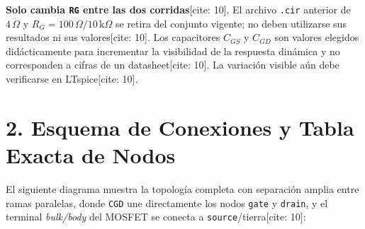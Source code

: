 \documentclass[11pt, a4paper]{article}
\begin{document}
\begin{tcolorbox}[colback=yellow!10, colframe=orange!80!black, title=\textbf{Control de Variables y Retiro de Versión Anterior}]
    \textbf{Solo cambia \texttt{RG} entre las dos corridas}[cite: 10]. El archivo \texttt{.cir} anterior de $4\,\Omega$ y $R_G = 100\,\Omega / 10\,\text{k}\Omega$ se retira del conjunto vigente; no deben utilizarse sus resultados ni sus valores[cite: 10]. Los capacitores $C_{GS}$ y $C_{GD}$ son valores elegidos didácticamente para incrementar la visibilidad de la respuesta dinámica y no corresponden a cifras de un datasheet[cite: 10]. La variación visible aún debe verificarse en LTspice[cite: 10].
\end{tcolorbox}

\section*{2. Esquema de Conexiones y Tabla Exacta de Nodos}
El siguiente diagrama muestra la topología completa con separación amplia entre ramas paralelas, donde \texttt{CGD} une directamente los nodos \texttt{gate} y \texttt{drain}, y el terminal \textit{bulk/body} del MOSFET se conecta a \texttt{source}/tierra[cite: 10]:
\end{document}
